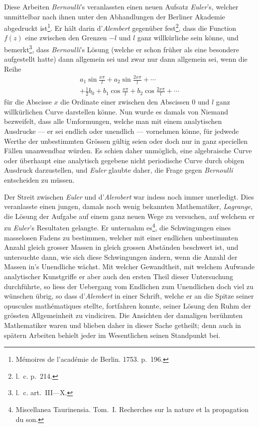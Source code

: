 \documentclass[12pt,a4paper]{article}
\begin{document}
Diese Arbeiten \textit{Bernoulli}'s veranlassten einen neuen Aufsatz \textit{Euler}'s, welcher unmittelbar nach ihnen unter den Abhandlungen der Berliner Akademie abgedruckt ist\footnote{Mémoires de l'académie de Berlin. 1753. p.~196.}. Er hält darin d'\textit{Alembert} gegenüber fest\footnote{l.~c. p.~214.}, dass die Function $f(z)$ eine zwischen den Grenzen $-l$ und $l$ ganz willkürliche sein könne, und bemerkt\footnote{l.~c. art.~III---X.}, dass \textit{Bernoulli}'s Lösung (welche er schon früher als eine besondere aufgestellt hatte) dann allgemein sei und zwar nur dann allgemein sei, wenn die Reihe
\begin{multline*}
a_1\sin\frac{x\pi}{l} + a_2\sin\frac{2x\pi}{l} + \cdots\\
+ \tfrac{1}{2}b_0 + b_1\cos\frac{x\pi}{l} + b_2\cos\frac{2x\pi}{l} + \cdots
\end{multline*}
für die Abscisse $x$ die Ordinate einer zwischen den Abscissen $0$ und $l$ ganz willkürlichen Curve darstellen könne. Nun wurde es damals von Niemand bezweifelt, dass alle Umformungen, welche man mit einem analytischen Ausdrucke --- er sei endlich oder unendlich --- vornehmen könne, für jedwede Werthe der unbestimmten Grössen gültig seien oder doch nur in ganz speciellen Fällen unanwendbar würden. Es schien daher unmöglich, eine algebraische Curve oder überhaupt eine analytisch gegebene nicht periodische Curve durch obigen Ausdruck darzustellen, und \textit{Euler} glaubte daher, die Frage gegen \textit{Bernoulli} entscheiden zu müssen.

Der Streit zwischen \textit{Euler} und d'\textit{Alembert} war indess noch immer unerledigt. Dies veranlasste einen jungen, damals noch wenig bekannten Mathematiker, \textit{Lagrange}, die Lösung der Aufgabe auf einem ganz neuen Wege zu versuchen, auf welchem er zu \textit{Euler}'s Resultaten gelangte. Er unternahm es\footnote{Miscellanea Taurinensia. Tom.~I. Recherches sur la nature et la propagation du son.}, die Schwingungen eines masselosen Fadens zu bestimmen, welcher mit einer endlichen unbestimmten Anzahl gleich grosser Massen in gleich grossen Abständen beschwert ist, und untersuchte dann, wie sich diese Schwingungen ändern, wenn die Anzahl der Massen in's Unendliche wächst. Mit welcher Gewandtheit, mit welchem Aufwande analytischer Kunstgriffe er aber auch den ersten Theil dieser Untersuchung durchführte, so liess der Uebergang vom Endlichen zum Unendlichen doch viel zu wünschen übrig, so dass d'\textit{Alembert} in einer Schrift, welche er an die Spitze seiner opuscules mathématiques stellte, fortfahren konnte, seiner Lösung den Ruhm der grössten Allgemeinheit zu vindiciren. Die Ansichten der damaligen berühmten Mathematiker waren und blieben daher in dieser Sache getheilt; denn auch in spätern Arbeiten behielt jeder im Wesentlichen seinen Standpunkt bei.
\end{document}
